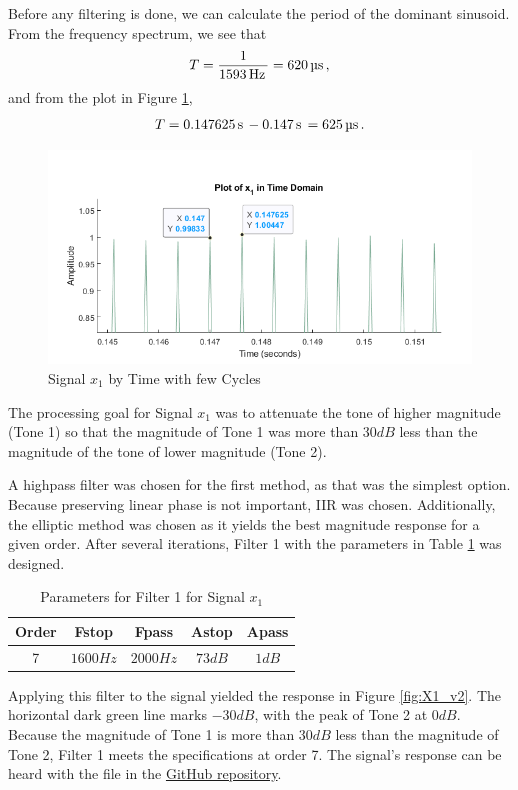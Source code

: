 Before any filtering is done, we can calculate the period of the dominant sinusoid.  From the frequency spectrum, we see that
\begin{align*}
    T = \frac{1}{1593 \, \text{Hz} \,} = 620 \, \text{$\micro$s} \,,
\end{align*}
and from the plot in Figure \ref{fig:x1_timeT},
\begin{align*}
    T = 0.147625 \, \text{s} \, - 0.147 \, \text{s} \, = 625 \, \text{$\micro$s} \,.
\end{align*}

\begin{figure}
    \centering
    \includegraphics[width=0.5\linewidth]{figures/x1_timeperiod.png}
    \caption{Signal $x_1$ by Time with few Cycles}
    \label{fig:x1_timeT}
\end{figure}

The processing goal for Signal $x_1$ was to attenuate the tone of higher magnitude (Tone 1) so that the magnitude of Tone 1 was more than $30 \unit{dB}$ less than the magnitude of the tone of lower magnitude (Tone 2).  

A highpass filter was chosen for the first method, as that was the simplest option.  Because preserving linear phase is not important, IIR was chosen.  Additionally, the elliptic method was chosen as it yields the best magnitude response for a given order.  After several iterations, Filter 1 with the parameters in Table \ref{tab:x1_v2} was designed.

\begin{table}[H]
    \centering
    \begin{tabular}{c|cccc}
         Order & Fstop & Fpass & Astop & Apass \\ \hline
         7 & $1600  \unit{Hz}$ & $2000  \unit{Hz}$ & $73  \unit{dB} $ & $1  \unit{dB}$
    \end{tabular}
    \caption{Parameters for Filter 1 for Signal $x_1$}
    \label{tab:x1_v2}
\end{table}

Applying this filter to the signal yielded the response in Figure \ref{fig:X1_v2}.  The horizontal dark green line marks $-30\unit{dB}$, with the peak of Tone 2 at $0 \unit{dB}$.  Because the magnitude of Tone 1 is more than $30 \unit{dB}$ less than the magnitude of Tone 2, Filter 1 meets the specifications at order 7.  The signal's response can be heard with the  file in the \href{https://github.com/dbcometto/ece434_cpx2}{GitHub repository}.

